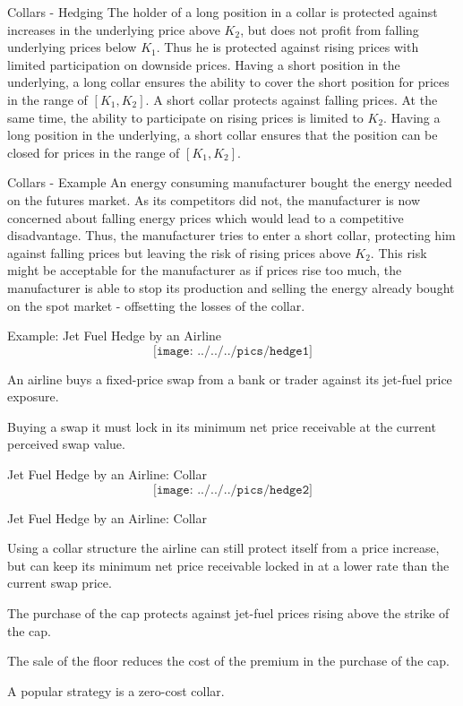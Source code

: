 {Collars - Hedging}
The holder of a long position in a collar is protected against increases in the underlying price above $K_2$, but does not profit from falling underlying prices below $K_1$. Thus he is protected against rising prices with limited participation on downside prices. Having a short position in the underlying, a long collar ensures the ability to cover the short position for prices in the range of $[K_1, K_2]$.
A short collar protects against falling prices. At the same time, the ability to participate on rising prices is limited to $K_2$. Having a long position in the underlying, a short collar ensures that the position can be closed for prices in the range of $[K_1, K_2]$.

{Collars - Example}
An energy consuming manufacturer bought the energy needed on the futures market. As its competitors did not, the manufacturer is now concerned about falling energy prices which would lead to a competitive disadvantage. Thus, the manufacturer tries to enter a short collar, protecting him against falling prices but leaving the risk of rising prices above $K_2$. This risk might be acceptable for the manufacturer as if prices rise too much, the manufacturer is able to stop its production and selling the energy already bought on the spot market - offsetting the losses of the collar.

{Example: Jet Fuel Hedge by an Airline}
\vspace{-0.4cm}
$$\texttt{[image: ../../../pics/hedge1]}$$
\vspace{-0.7cm}
  \item An airline buys a fixed-price swap from a bank or trader against its jet-fuel price exposure.
  \item Buying a swap it must lock in its minimum net price receivable at the current perceived swap value.

{Jet Fuel Hedge by an Airline: Collar}
\vspace{-0.4cm}
$$\texttt{[image: ../../../pics/hedge2]}$$

{Jet Fuel Hedge by an Airline: Collar}
  \item Using a collar structure the airline can still protect itself from a price increase, but can keep its minimum net price receivable locked in at a lower rate than the current swap price.
  \item The purchase of the cap protects against jet-fuel prices rising above the strike of the cap.
  \item The sale of the floor reduces the cost of the premium in the purchase of the cap.
  \item A popular strategy is a zero-cost collar.

